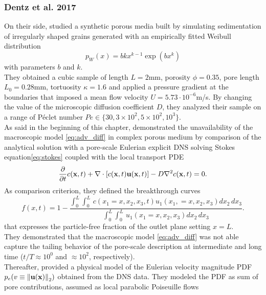 \subsubsection{Dentz et al. 2017}
On their side, \citet{Dentz2017} studied a synthetic porous media built by simulating sedimentation of irregularly shaped grains generated with an empirically fitted Weibull distribution
\begin{equation}\label{eq:weibull}
	p_W(x)=bkx^{k-1}\exp(bx^k)
\end{equation}
with parameters $b$ and $k$.\\
They obtained a cubic sample of length $L=2$mm, porosity $\phi=0.35$, pore length $L_0=0.28$mm, tortuosity $\kappa=1.6$ and applied a pressure gradient at the boundaries that imposed a mean flow velocity $U=5.73\cdot10^{-6}$m/s. By changing the value of the microscopic diffusion coefficient $D$, they analyzed their sample on a range of Péclet number $Pe\in\{30, 3\times 10^2, 5\times 10^2, 10^3\}$.\\
As said in the beginning of this chapter, \citeauthor{Dentz2017} demonstrated the unavailability of the macroscopic model \eqref{eq:adv_diff} in complex porous medium by comparison of the analytical solution with a pore-scale Eulerian explicit DNS solving Stokes equation\eqref{eq:stokes} coupled with the local transport PDE
\begin{equation}\label{eq:micro_adv_diff}
\pdv{t}c(\textbf{x},t)+\nabla\cdot[c(\textbf{x},t)\textbf{u}(\textbf{x},t)]-D \nabla^2c(\textbf{x},t)=0.
\end{equation}
As comparison criterion, they defined the breakthrough curves
\begin{equation}
f(x,t)=1-\frac{\int_0^L\int_0^L\,c(x_1=x, x_2,x_3,t)u_1(x_1,=x,x_2,x_3)dx_2\,dx_3}{\int_0^L\int_0^L\,u_1(x_1=x,x_2,x_3)dx_2\,dx_3}.
\label{eq:DentzBTC}
\end{equation}
that expresses the particle-free fraction of the outlet plane setting $x=L$.\\
They demonstrated that the macroscopic model \eqref{eq:adv_diff} was not able capture the tailing behavior of the pore-scale description at intermediate and long time ($t/T\approx 10^0$ and $\approx 10^2$, respectively).\\
Thereafter, \citeauthor{Dentz2017} provided a physical model of the Eulerian velocity magnitude PDF $p_e(v\equiv\norm{\textbf{u}(\textbf{x})}_2)$  obtained from the DNS data. 
They modeled the PDF as sum of pore contributions, assumed as local parabolic Poiseuille flows 
